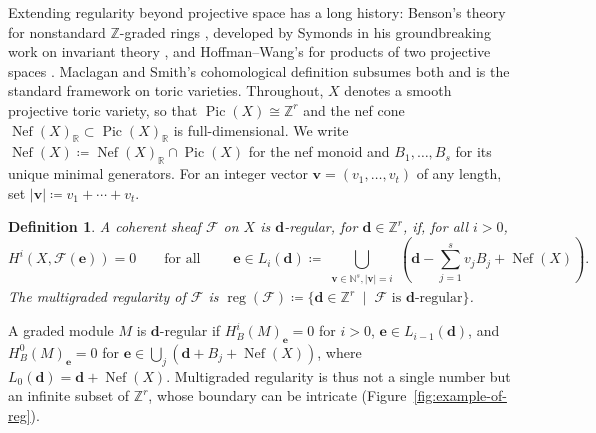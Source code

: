\documentclass[11pt,reqno]{amsart}
\newtheorem{defn}[lemma]{Definition}
\theoremstyle{remark}
\newcommand{\reg}{\operatorname{reg}}
\newcommand{\Pic}{\operatorname{Pic}}
\newcommand{\Nef}{\operatorname{Nef}}
\newcommand{\dd}{\mathbf{d}}
\newcommand{\ee}{\mathbf{e}}
\newcommand{\vv}{\mathbf{v}}
\newcommand{\NN}{\mathbb{N}}
\newcommand{\PP}{\mathbb{P}}
\newcommand{\RR}{\mathbb{R}}
\newcommand{\ZZ}{\mathbb{Z}}
\newcommand{\cF}{\mathcal{F}}
\begin{document}

Extending regularity beyond projective space has a long history: Benson's theory for nonstandard $\ZZ$-graded rings \cite{benson04}, developed by Symonds in his groundbreaking work on invariant theory \cite{symonds10,symonds11}, and Hoffman--Wang's for products of two projective spaces \cite{hoffmanWang04}. Maclagan and Smith's cohomological definition \cite{maclaganSmith04} subsumes both and is the standard framework on toric varieties. Throughout, $X$ denotes a smooth projective toric variety, so that $\Pic(X)\cong \ZZ^r$ and the nef cone $\Nef(X)_{\RR} \subset \Pic(X)_{\RR}$ is full-dimensional. We write $\Nef(X)\coloneqq \Nef(X)_{\RR} \cap \Pic(X)$ for the nef monoid and $B_{1},\ldots,B_{s}$ for its unique minimal generators. For an integer vector $\vv=(v_1,\ldots,v_t)$ of any length, set $|\vv|\coloneqq v_1+\cdots+v_t$.

\begin{defn}\cite[Def.~6.6]{maclaganSmith04}\label{def:mg-reg}
A coherent sheaf $\cF$ on $X$ is \emph{$\dd$-regular}, for $\dd\in\ZZ^r$, if, for all $i>0$,
\[
H^i(X, \cF(\ee))=0 \qquad \text{for all } \qquad \ee \in L_{i}(\dd) \coloneqq \bigcup_{\substack{\vv\in \NN^s, |\vv|=i}} \left(\dd-\sum_{j=1}^{s}v_{j}B_j + \Nef(X)\right).
\]
The \emph{multigraded regularity} of $\cF$ is $\reg(\cF)\coloneqq \{\dd\in \ZZ^r \;\; | \;\; \text{$\cF$ is $\dd$-regular}\}$.
\end{defn}

A graded module $M$ is $\dd$-regular if $H_B^i(M)_\ee=0$ for $i>0$, $\ee\in L_{i-1}(\dd)$, and $H_B^0(M)_\ee=0$ for $\ee\in\bigcup_j(\dd+B_j+\Nef(X))$, where $L_0(\dd)=\dd+\Nef(X)$. Multigraded regularity is thus not a single number but an infinite subset of $\ZZ^{r}$, whose boundary can be intricate (Figure~\ref{fig:example-of-reg}).
\end{document}

